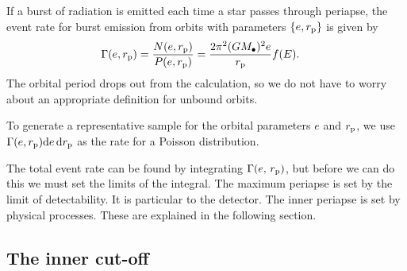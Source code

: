 If a burst of radiation is emitted each time a star passes through periapse, the event rate for burst emission from orbits with parameters $\{e, r_\mathrm{p}\}$ is given by
\begin{align}
\Gamma(e, r_\mathrm{p}) = {} & \dfrac{N(e, r_\mathrm{p})}{P(e, r_\mathrm{p})} = \dfrac{2\pi^2(GM_\bullet)^2 e}{r_\mathrm{p}}f(E).
\label{eq:Gamma}
\end{align}
The orbital period drops out from the calculation, so we do not have to worry about an appropriate definition for unbound orbits.



To generate a representative sample for the orbital parameters $e$ and $r_\mathrm{p}$, we use $\Gamma(e, r_\mathrm{p})\mathrm{d} e\, \mathrm{d} r_\mathrm{p}$ as the rate for a Poisson distribution.

The total event rate can be found by integrating $\Gamma(e,\,r_\mathrm{p})$, but before we can do this we must set the limits of the integral. The maximum periapse is set by the limit of detectability. It is particular to the detector. The inner periapse is set by physical processes. These are explained in the following section.

\subsection{The inner cut-off}\label{sec:inner-cut}

